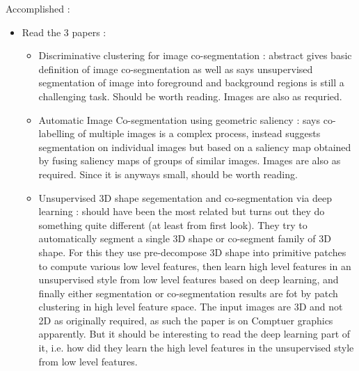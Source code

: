 \documentclass{article}
\begin{document}
Accomplished :
\begin{itemize}
\item Read the 3 papers :
  \begin{itemize}
  \item Discriminative clustering for image co-segmentation \cite{5539868}: abstract gives basic definition of image co-segmentation as well as says unsupervised segmentation of image into foreground and background regions is still a challenging task. Should be worth reading. Images are also as requried.
  \item Automatic Image Co-segmentation using geometric saliency \cite{7025663}: says co-labelling of multiple images is a complex process, instead suggests segmentation on individual images but based on a saliency map obtained by fusing saliency maps of groups of similar images. Images are also as required. Since it is anyways small, should be worth reading.
  \item Unsupervised 3D shape segementation and co-segmentation via deep learning \cite{SHU201639}: should have been the most related but turns out they do something quite different (at least from first look). They try to automatically segment a single 3D shape or co-segment family of 3D shape. For this they use pre-decompose 3D shape into primitive patches to compute various low level features, then learn high level features in an unsupervised style from low level features based on deep learning, and finally either segmentation or co-segmentation results are fot by patch clustering in high level feature space. The input images are 3D and not 2D as originally required, as such the paper is on Comptuer graphics apparently. But it should be interesting to read the deep learning part of it, i.e. how did they learn the high level features in the unsupervised style from low level features.
  \end{itemize}
\end{itemize}



\end{document}
